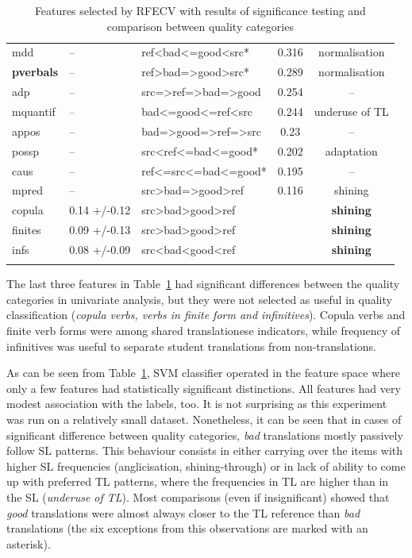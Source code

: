 \begin{longtable}{l|llcc}
		\textcolor{cadmiumgreen}{mdd}  & -- & ref<bad<=good<src*    & 0.316 & normalisation \\
		\textbf{pverbals}     & --     & ref>bad=>good>src* & 0.289 & normalisation  \\
		\textcolor{cadmiumgreen}{adp}  & -- & src=>ref=>bad=>good & 0.254 & -- \\
		\textcolor{Dandelion}{mquantif}& -- & bad<=good<=ref<src & 0.244 & underuse of TL  \\
		appos        & --           & bad=>good=>ref=>src & 0.23 & --  \\
		possp        & --           & src<ref<=bad<=good*    & 0.202 & adaptation \\
		\textcolor{Dandelion}{caus} & -- & ref<=src<=bad<=good*  & 0.195 & -- \\
		\textcolor{Dandelion}{mpred} & -- & src>bad=>good>ref & 0.116 & shining \\
		\midrule
		copula       & 0.14 +/-0.12 & src>bad>good>ref &  & \textbf{shining}           \\
		finites      & 0.09 +/-0.13 & src>bad>good>ref &     & \textbf{shining}      \\
		infs         & 0.08 +/-0.09 & src<bad<good<ref    &  & \textbf{shining}          \\		
		\bottomrule
\caption{\label{tab:bad-good_indicators}Features selected by RFECV with results of significance testing and comparison between quality categories}\\
\end{longtable}

The last three features in Table~\ref{tab:bad-good_indicators} had significant differences between the quality categories in univariate analysis, but they were not selected as useful in quality classification (\textit{copula verbs, verbs in finite form and infinitives}). Copula verbs and finite verb forms were among shared translationese indicators, while frequency of infinitives was useful to separate student translations from non-translations.

As can be seen from Table~\ref{tab:bad-good_indicators}, SVM classifier operated in the feature space where only a few features had statistically significant distinctions. All features had very modest association with the labels, too. It is not surprising as this experiment was run on a relatively small dataset.
Nonetheless, it can be seen that in cases of significant difference between quality categories, \textit{bad} translations mostly passively follow SL patterns. This behaviour consists in either carrying over the items with higher SL frequencies (anglicisation, shining-through) or in lack of ability to come up with preferred TL patterns, where the frequencies in TL are higher than in the SL (\textit{underuse of TL}). 
Most comparisons (even if insignificant) showed that \textit{good} translations were almost always closer to the TL reference than \textit{bad} translations (the six exceptions from this observations are marked with an asterisk).  

